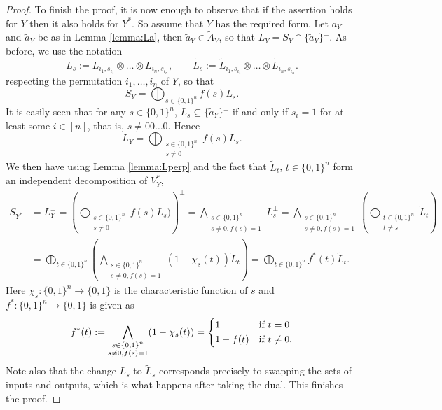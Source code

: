 \documentclass[12pt]{article}
\theoremstyle{definition}
\theoremstyle{remark}
\begin{document}
\begin{proof}
To finish the proof, it is now enough to observe that if the assertion holds for $Y$ then
it also  holds for $Y^*$. So assume that $Y$ has the required form. 
Let $a_Y$ and $\tilde a_Y$ be as in  Lemma \ref{lemma:La}, then $\tilde a_Y\in \tilde
A_Y$, so that $L_Y=S_Y\cap\{\tilde a_Y\}^\perp$. 
As before, we use the notation
\[
L_s:=L_{i_1,s_{i_1}}\otimes\dots\otimes  L_{i_n,s_{i_n}},\qquad \tilde L_s:=\tilde
L_{i_1,s_{i_1}}\otimes\dots\otimes  \tilde L_{i_n,s_{i_n}}.
\]
respecting the permutation $i_1,\dots,i_n$ of $Y$, so that
\[
S_Y=\bigoplus_{s\in\{0,1\}^n}f(s)L_s.
\]
It is easily seen that for any $s\in
\{0,1\}^n$, $L_s\subseteq \{\tilde a_Y\}^\perp$ if and only if $s_i=1$ for at least some $i\in [n]$,
that is, $s\ne 00\dots0$. Hence
\[
L_Y=\bigoplus_{\substack{s\in \{0,1\}^n\\ s\ne 0}} f(s) L_s.
\]
We then have using Lemma \ref{lemma:Lperp} and the fact that $\tilde L_t$, $t\in
\{0,1\}^n$ form an independent decomposition of $V_Y^*$,
\begin{align*}
S_{Y^*}&=L_Y^\perp=\left(\bigoplus_{\substack{s\in \{0,1\}^n\\ s\ne 0}}
f(s)L_s)\right)^\perp=\bigwedge_{\substack{s\in\{0,1\}^n\\ s\ne 0, f(s)=1}}L_s^\perp=
\bigwedge_{\substack{s\in\{0,1\}^n\\ s\ne 0,
f(s)=1}}\left(\bigoplus_{\substack{t\in\{0,1\}^n\\t\ne s}} \tilde L_t\right)\\
&=\bigoplus_{t\in\{0,1\}^n} \left(\bigwedge_{\substack{s\in \{0,1\}^n\\ s\ne 0, f(s)=1}}
(1-\chi_s(t))\tilde L_t\right)=\bigoplus_{t\in \{0,1\}^n} f^*(t) \tilde L_t.
\end{align*}
Here $\chi_s:\{0,1\}^n\to \{0,1\}$ is the characteristic function of $s$ and
$f^*:\{0,1\}^n\to \{0,1\}$ is given as
\[
f^*(t):=\bigwedge_{\substack{s\in \{0,1\}^n\\ s\ne 0, f(s)=1}}
(1-\chi_s(t))=\begin{dcases} 1 & \text{if } t=0\\ 1-f(t) & \text{if } t\ne 0.
\end{dcases}
\]
Note also that the change $L_s$ to $\tilde L_s$ corresponds precisely to swapping the sets
of inputs and outputs, which is what happens after taking the dual. This finishes the
proof.

\end{proof}
\end{document}
